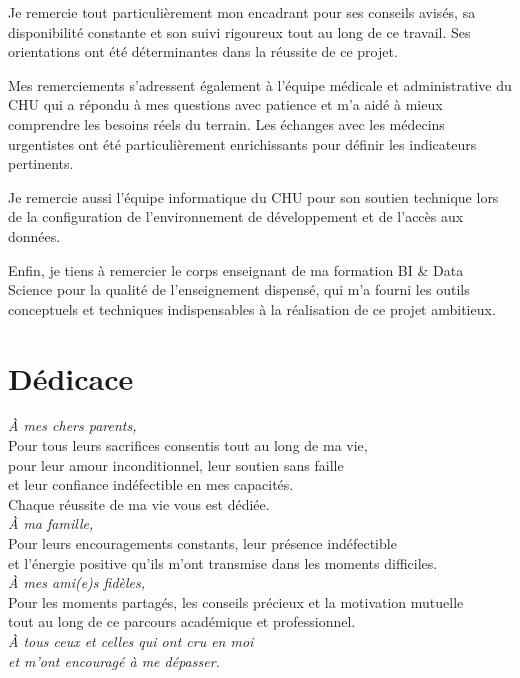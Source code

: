 \documentclass[12pt,a4paper]{report}
\begin{document}
	Je remercie tout particulièrement mon encadrant pour ses conseils avisés, sa disponibilité
	constante et son suivi rigoureux tout au long de ce travail. Ses orientations ont été
	déterminantes dans la réussite de ce projet.
	
	Mes remerciements s'adressent également à l'équipe médicale et administrative du CHU qui
	a répondu à mes questions avec patience et m'a aidé à mieux comprendre les besoins réels
	du terrain. Les échanges avec les médecins urgentistes ont été particulièrement enrichissants
	pour définir les indicateurs pertinents.
	
	Je remercie aussi l'équipe informatique du CHU pour son soutien technique lors de la
	configuration de l'environnement de développement et de l'accès aux données.
	
	Enfin, je tiens à remercier le corps enseignant de ma formation BI \& Data Science pour
	la qualité de l'enseignement dispensé, qui m'a fourni les outils conceptuels et techniques
	indispensables à la réalisation de ce projet ambitieux.
	
	\chapter*{Dédicace}
	
	\begin{center}
		\vspace*{1.5cm}
		\textit{\Large À mes chers parents,}\\[0.6cm]
		{\normalsize
			Pour tous leurs sacrifices consentis tout au long de ma vie,\\
			pour leur amour inconditionnel, leur soutien sans faille\\
			et leur confiance indéfectible en mes capacités.\\
			Chaque réussite de ma vie vous est dédiée.\\[1cm]
		}
		\textit{\Large À ma famille,}\\[0.6cm]
		{\normalsize
			Pour leurs encouragements constants, leur présence indéfectible\\
			et l'énergie positive qu'ils m'ont transmise dans les moments difficiles.\\[1cm]
		}
		\textit{\Large À mes ami(e)s fidèles,}\\[0.6cm]
		{\normalsize
			Pour les moments partagés, les conseils précieux et la motivation mutuelle\\
			tout au long de ce parcours académique et professionnel.\\[1cm]
		}
		\textit{\Large À tous ceux et celles qui ont cru en moi\\
			et m'ont encouragé à me dépasser.}
	\end{center}
	
\end{document}
